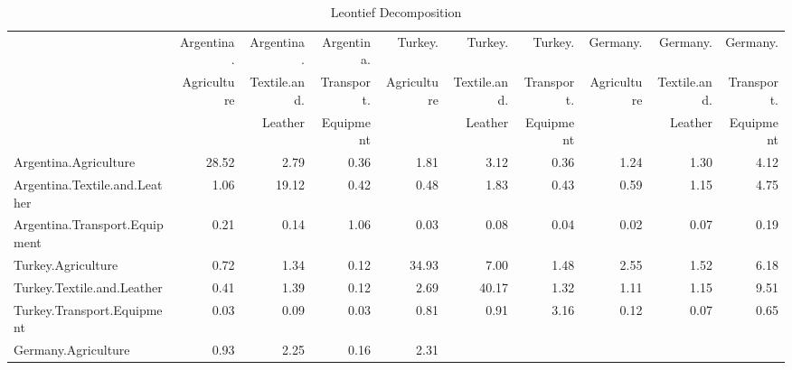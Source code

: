 \documentclass[a4paper]{article}\usepackage[]{graphicx}\usepackage[]{color}
\providecommand{\tabularnewline}{\\}
\begin{document}
\begin{sidewaystable}
{\scriptsize{}\caption{Leontief Decomposition}
\label{tab:leon} }%
\begin{tabular}{lrrrrrrrrr}
\hline 
 &
{\scriptsize{}Argentina. } &
{\scriptsize{}Argentina. } &
{\scriptsize{}Argentina. } &
{\scriptsize{}Turkey. } &
{\scriptsize{}Turkey. } &
{\scriptsize{}Turkey. } &
{\scriptsize{}Germany. } &
{\scriptsize{}Germany. } &
{\scriptsize{}Germany.}\tabularnewline
 &
{\scriptsize{}Agriculture } &
{\scriptsize{}Textile.and. } &
{\scriptsize{}Transport. } &
{\scriptsize{}Agriculture } &
{\scriptsize{}Textile.and. } &
{\scriptsize{}Transport. } &
{\scriptsize{}Agriculture } &
{\scriptsize{}Textile.and. } &
{\scriptsize{}Transport.}\tabularnewline
 &
 &
{\scriptsize{}Leather } &
{\scriptsize{}Equipment } &
 &
{\scriptsize{}Leather } &
{\scriptsize{}Equipment } &
 &
{\scriptsize{}Leather } &
{\scriptsize{}Equipment}\tabularnewline
\hline 
{\scriptsize{}Argentina.Agriculture } &
{\scriptsize{}28.52 } &
{\scriptsize{}2.79 } &
{\scriptsize{}0.36 } &
{\scriptsize{}1.81 } &
{\scriptsize{}3.12 } &
{\scriptsize{}0.36 } &
{\scriptsize{}1.24 } &
{\scriptsize{}1.30 } &
{\scriptsize{}4.12 }\tabularnewline
{\scriptsize{}Argentina.Textile.and.Leather } &
{\scriptsize{}1.06 } &
{\scriptsize{}19.12 } &
{\scriptsize{}0.42 } &
{\scriptsize{}0.48 } &
{\scriptsize{}1.83 } &
{\scriptsize{}0.43 } &
{\scriptsize{}0.59 } &
{\scriptsize{}1.15 } &
{\scriptsize{}4.75 }\tabularnewline
{\scriptsize{}Argentina.Transport.Equipment } &
{\scriptsize{}0.21 } &
{\scriptsize{}0.14 } &
{\scriptsize{}1.06 } &
{\scriptsize{}0.03 } &
{\scriptsize{}0.08 } &
{\scriptsize{}0.04 } &
{\scriptsize{}0.02 } &
{\scriptsize{}0.07 } &
{\scriptsize{}0.19 }\tabularnewline
{\scriptsize{}Turkey.Agriculture } &
{\scriptsize{}0.72 } &
{\scriptsize{}1.34 } &
{\scriptsize{}0.12 } &
{\scriptsize{}34.93 } &
{\scriptsize{}7.00 } &
{\scriptsize{}1.48 } &
{\scriptsize{}2.55 } &
{\scriptsize{}1.52 } &
{\scriptsize{}6.18 }\tabularnewline
{\scriptsize{}Turkey.Textile.and.Leather } &
{\scriptsize{}0.41 } &
{\scriptsize{}1.39 } &
{\scriptsize{}0.12 } &
{\scriptsize{}2.69 } &
{\scriptsize{}40.17 } &
{\scriptsize{}1.32 } &
{\scriptsize{}1.11 } &
{\scriptsize{}1.15 } &
{\scriptsize{}9.51 }\tabularnewline
{\scriptsize{}Turkey.Transport.Equipment } &
{\scriptsize{}0.03 } &
{\scriptsize{}0.09 } &
{\scriptsize{}0.03 } &
{\scriptsize{}0.81 } &
{\scriptsize{}0.91 } &
{\scriptsize{}3.16 } &
{\scriptsize{}0.12 } &
{\scriptsize{}0.07 } &
{\scriptsize{}0.65 }\tabularnewline
{\scriptsize{}Germany.Agriculture } &
{\scriptsize{}0.93 } &
{\scriptsize{}2.25 } &
{\scriptsize{}0.16 } &
{\scriptsize{}2.31 } &

\end{tabular}
\end{sidewaystable}
\end{document}
